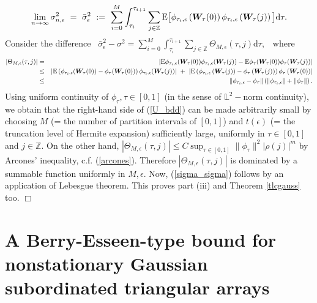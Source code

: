\documentclass[10pt]{article}
\def\L{\mathbb{L}}
\def\Z{\mathbb{Z}}
\def\d{\mathrm d}
\def\E{\mathrm E}
\newcommand{\mbf}[1]{\mbox{\boldmath $#1$}}
\begin{document}
$$
\lim_{n \to \infty} \sigma^2_{n, \epsilon} \ =  \  \bar
\sigma^2_\epsilon \ := \ \sum_{i=0}^M \int_{\tau_i}^{\tau_{i+1}}
\sum_{j\in {\Z}} \E \big[\phi_{\tau_i,\epsilon} \left({\mbf W}_{\!
\tau}(0)\right) \phi_{\tau_i,\epsilon} \left({\mbf W}_{\!
\tau}(j)\right)\big] \d \tau.
$$
Consider the difference \  $ \bar \sigma^2_\epsilon - \sigma^2 =
\sum_{i=0}^M \int_{\tau_i}^{\tau_{i+1}} \sum_{j\in {\Z}}
\Theta_{M,\epsilon}(\tau,j) \d \tau, $ \  where
\begin{eqnarray}
|\Theta_{M,\epsilon}(\tau,j)|&=&\left|\E  \phi_{\tau_i,\epsilon}
({\mbf W}_{\! \tau}(0)) \phi_{\tau_i,\epsilon}({\mbf W}_{\!
\tau}(j))
- \E \phi_{\tau} ({\mbf W}_{\! \tau}(0)) \phi_{\tau}({\mbf W}_{\! \tau}(j)) \right| \nonumber  \\
&\le&\left|\E \left(\phi_{\tau_i,\epsilon}({\mbf W}_{\! \tau}(0))
- \phi_{\tau}({\mbf W}_{\! \tau}(0)) \right)
\phi_{\tau_i,\epsilon}({\mbf W}_{\! \tau}(j)) \right| \ +\
\left|\E \left(\phi_{\tau_i,\epsilon} \left({\mbf W}_{\!
\tau}(j)\right) - \phi_{\tau} \left({\mbf W}_{\!
\tau}(j)\right)\right)
\phi_{\tau} \left({\mbf W}_{\! \tau}(0) \right)\right| \nonumber \\
&\le&\|\phi_{\tau_i,\epsilon} - \phi_\tau\| \left(\|\phi_{\tau_i,
\epsilon}\| + \|\phi_{\tau}\| \right). \label{U_bdd}
\end{eqnarray}
Using uniform continuity of $\phi_\tau, \tau \in [0,1]$ (in the
sense of $\L^2-$norm continuity), we obtain that the right-hand side
of (\ref{U_bdd}) can be made arbitrarily small by choosing $M $ (=
the number of partition intervals of $[0,1]$) and $t(\epsilon)$ (=
the truncation level of Hermite expansion) sufficiently large,
uniformly in $\tau \in [0,1]$ and $j\in {\Z}$. On the other hand, $
|\Theta_{M,\epsilon}(\tau,j)| \le C\sup_{\tau \in [0,1]}\|\phi_\tau
\|^2 |\rho(j)|^m $
 by Arcones' inequality, c.f. (\ref{arcones}). Therefore
 $|\Theta_{M,\epsilon}(\tau,j)|$ is dominated by a summable function
 uniformly in $M, \epsilon$. Now, (\ref{sigma_sigma}) follows by an application of Lebesgue
 theorem. This proves part (iii) and Theorem \ref{tlcgauss} too. \hfill $\Box $


 \section{A Berry-Esseen-type bound for nonstationary Gaussian subordinated triangular arrays}\label{breuer}
\end{document}
